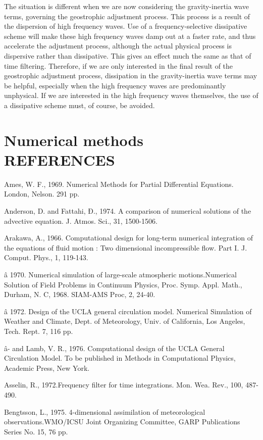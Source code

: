 The situation is different when we are now considering the
gravity-inertia wave terms, governing the geostrophic adjustment
process. This process is a result of the dispersion of high frequency
waves. Use of a frequency-selective dissipative scheme will make these
high frequency waves damp out at a faster rate, and thus accelerate
the adjustment process, although the actual physical process is
dispersive rather than dissipative. This gives an effect much the same
as that of time filtering. Therefore, if we are only interested in the
final result of the geostrophic adjustment process, dissipation in the
gravity-inertia wave terms may be helpful, especially when the high
frequency waves are predominantly unphysical. If we are interested in
the high frequency waves themselves, the use of a dissipative scheme
must, of course, be avoided.

\section{Numerical methods REFERENCES}



Ames, W. F., 1969. Numerical Methods for Partial Differential Equations.
London, Nelson. 291 pp.

Anderson, D. and Fattahi, Ð., 1974. A comparison of numerical solutions
of the advective equation. J. Atmos. Sci., 31, 1500-1506.

Arakawa, A., 1966. Computational design for long-term numerical
integration of the equations of fluid motion : Two dimensional
incompressible flow. Part I. J. Comput. Phys., 1, 119-143.

â 1970. Numerical simulation of large-scale atmospheric
motions.Numerical Solution of Field Problems in Continuum Physics, Proc.
Symp. Appl. Math., Durham, N. C, 1968. SIAM-AMS Proc, 2, 24-40.

â 1972. Design of the UCLA general circulation model. Numerical
Simulation of Weather and Climate, Dept. of Meteorology, Univ. of
California, Los Angeles, Tech. Rept. 7, 116 pp.

â- and Lamb, V. R., 1976. Computational design of the UCLA General
Circulation Model. To be published in Methods in Computational Physics,
Academic Press, New York.

Asselin, R., 1972.Frequency filter for time integrations. Mon. Wea.
Rev., 100, 487-490.

Bengtsson, L., 1975. 4-dimensional assimilation of meteorological
observations.WMO/ICSU Joint Organizing Committee, GARP Publications
Series No. 15, 76 pp.

